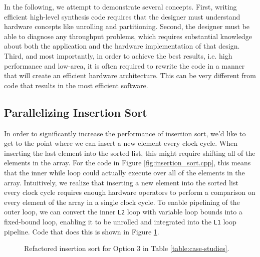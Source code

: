 In the following, we attempt to demonstrate several concepts. First, writing efficient high-level synthesis code requires that the designer must understand hardware concepts like unrolling and partitioning. Second, the designer must be able to diagnose any throughput problems, which requires substantial knowledge about both the application and the hardware implementation of that design. Third, and most importantly, in order to achieve the best results, i.e. high performance and low-area, it is often required to rewrite the code in a manner that will create an efficient hardware architecture.  This can be very different from code that results in the most efficient software.

\subsection{Parallelizing Insertion Sort}

In order to significantly increase the performance of insertion sort, we'd like to get to the point where we can insert a new element every clock cycle.  When inserting the last element into the sorted list, this might require shifting all of the elements in the array.  For the code in Figure \ref{fig:insertion_sort.cpp}, this means that the inner while loop could actually execute over all of the elements in the array.  Intuitively, we realize that inserting a new element into the sorted list every clock cycle requires enough hardware operators to perform a comparison on every element of the array in a single clock cycle.  To enable pipelining of the outer loop, we can convert the inner \lstinline{L2} loop with variable loop bounds into a fixed-bound loop, enabling it to be unrolled and integrated into the \lstinline{L1} loop pipeline.  Code that does this is shown in Figure \ref{fig:insertion_sort_parallel.cpp}.

\begin{figure}

\caption{Refactored insertion sort for Option 3 in Table \ref{table:case-studies}.}
\label{fig:insertion_sort_parallel.cpp}
\end{figure}

